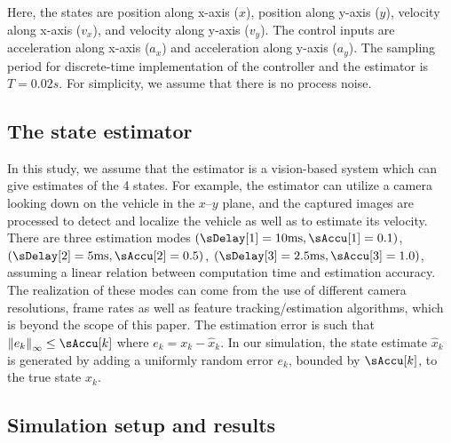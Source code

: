 %
Here, the states are position along x-axis ($x$), position along y-axis ($y$), velocity along x-axis ($v_x$), and velocity along y-axis ($v_y$).
The control inputs are acceleration along x-axis ($a_x$) and acceleration along y-axis ($a_y$).
The sampling period for discrete-time implementation of the controller and the estimator is $T=0.02s$.
For simplicity, we assume that there is no process noise.


\subsection{The state estimator}
In this study, we assume that the estimator is a vision-based system which can give estimates of the 4 states.
For example, the estimator can utilize a camera looking down on the vehicle in the $x$--$y$ plane, and the captured images are processed to detect and localize the vehicle as well as to estimate its velocity.
There are three estimation modes $\left(\sDelay[1]=10\mathrm{ms}, \sAccu[1]=0.1\right)$, $\left(\sDelay[2]=5\mathrm{ms}, \sAccu[2]=0.5\right)$, $\left(\sDelay[3]=2.5\mathrm{ms}, \sAccu[3]=1.0\right)$, assuming a linear relation between computation time and estimation accuracy.
The realization of these modes can come from the use of different camera resolutions, frame rates as well as feature tracking/estimation algorithms, which is beyond the scope of this paper.
The estimation error is such that $\norm{e_{k}}_\infty \leq \sAccu[k]$ where $e_{k}= x_{k}-\hat{x}_{k}$.
In our simulation, the state estimate $\hat{x}_{k}$ is generated by adding a uniformly random error $e_{k}$, bounded by $\sAccu[k]$, to the true state $x_{k}$.

\subsection{Simulation setup and results}

